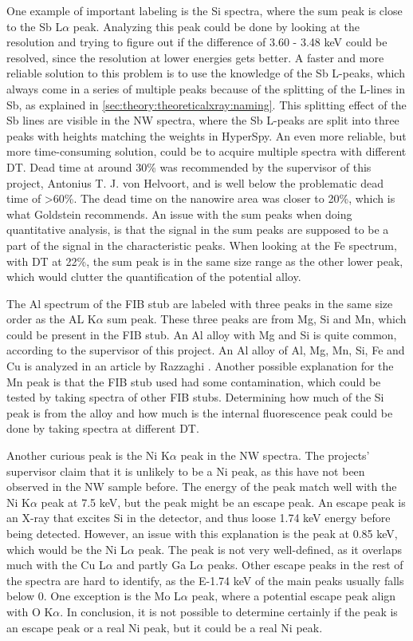 One example of important labeling is the Si spectra, where the sum peak is close to the Sb L$\alpha$ peak.
Analyzing this peak could be done by looking at the resolution and trying to figure out if the difference of 3.60 - 3.48 keV could be resolved, since the resolution at lower energies gets better.
A faster and more reliable solution to this problem is to use the knowledge of the Sb L-peaks, which always come in a series of multiple peaks because of the splitting of the L-lines in Sb, as explained in \cref{sec:theory:theoreticalxray:naming}.
This splitting effect of the Sb lines are visible in the NW spectra, where the Sb L-peaks are split into three peaks with heights matching the weights in HyperSpy.
An even more reliable, but more time-consuming solution, could be to acquire multiple spectra with different DT.
Dead time at around 30\% was recommended by the supervisor of this project, Antonius T. J. von Helvoort, and is well below the problematic dead time of >60\%.
The dead time on the nanowire area was closer to 20\%, which is what Goldstein \cite[page 223]{goldstein_scanning_2018} recommends.
An issue with the sum peaks when doing quantitative analysis, is that the signal in the sum peaks are supposed to be a part of the signal in the characteristic peaks.
When looking at the Fe spectrum, with DT at 22\%, the sum peak is in the same size range as the other lower peak, which would clutter the quantification of the potential alloy.


The Al spectrum of the FIB stub are labeled with three peaks in the same size order as the AL K$\alpha$ sum peak.
These three peaks are from Mg, Si and Mn, which could be present in the FIB stub.
An Al alloy with Mg and Si is quite common, according to the supervisor of this project.
An Al alloy of Al, Mg, Mn, Si, Fe and Cu is analyzed in an article by Razzaghi \cite{al_alloy}.
Another possible explanation for the Mn peak is that the FIB stub used had some contamination, which could be tested by taking spectra of other FIB stubs.
Determining how much of the Si peak is from the alloy and how much is the internal fluorescence peak could be done by taking spectra at different DT.


Another curious peak is the Ni K$\alpha$ peak in the NW spectra.
The projects' supervisor claim that it is unlikely to be a Ni peak, as this have not been observed in the NW sample before.
The energy of the peak match well with the Ni K$\alpha$ peak at 7.5 keV, but the peak might be an escape peak.
An escape peak is an X-ray that excites Si in the detector, and thus loose 1.74 keV energy before being detected.
However, an issue with this explanation is the peak at 0.85 keV, which would be the Ni L$\alpha$ peak.
The peak is not very well-defined, as it overlaps much with the Cu L$\alpha$  and partly Ga L$\alpha$ peaks.
Other escape peaks in the rest of the spectra are hard to identify, as the E-1.74 keV of the main peaks usually falls below 0.
One exception is the Mo L$\alpha$ peak, where a potential escape peak align with O K$\alpha$.
In conclusion, it is not possible to determine certainly if the peak is an escape peak or a real Ni peak, but it could be a real Ni peak.



